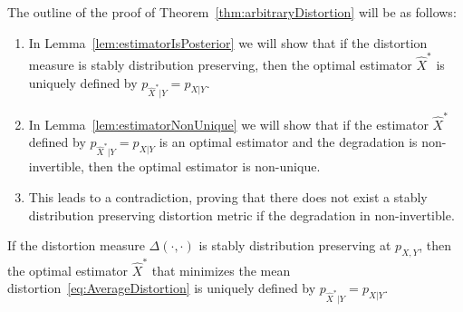 The outline of the proof of Theorem~\ref{thm:arbitraryDistortion} will be as follows:
\begin{enumerate}
    \item In Lemma~\ref{lem:estimatorIsPosterior} we will show that if the distortion measure is stably distribution preserving, then the optimal estimator $\hat{X}^*$ is uniquely defined by $p_{\hat{X}^*|Y} = p_{X|Y}$.
    \item In Lemma~\ref{lem:estimatorNonUnique} we will show that if the estimator $\hat{X}^*$ defined by $p_{\hat{X}^*|Y} = p_{X|Y}$ is an optimal estimator and the degradation is non-invertible, then the optimal estimator is non-unique.
    \item This leads to a contradiction, proving that there does not exist a stably distribution preserving distortion metric if the degradation in non-invertible.
\end{enumerate}

\begin{lemma}\label{lem:estimatorIsPosterior}
	If the distortion measure $\Delta(\cdot,\cdot)$ is stably distribution preserving at $p_{X,Y}$, then the optimal estimator $\hat{X}^*$ that minimizes the mean distortion~\eqref{eq:AverageDistortion} is uniquely defined by $p_{\hat{X}^*|Y} = p_{X|Y}$.
\end{lemma}


